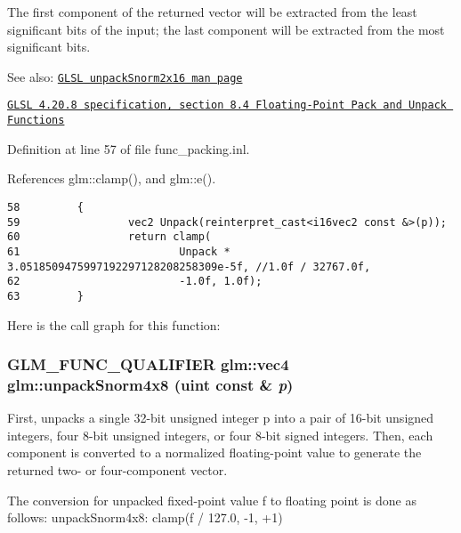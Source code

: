 The first component of the returned vector will be extracted from the least significant bits of the input; the last component will be extracted from the most significant bits.

\begin{Desc}
\item[See also:]\href{http://www.opengl.org/sdk/docs/manglsl/xhtml/unpackSnorm2x16.xml}{\tt GLSL unpackSnorm2x16 man page} 

\href{http://www.opengl.org/registry/doc/GLSLangSpec.4.20.8.pdf}{\tt GLSL 4.20.8 specification, section 8.4 Floating-Point Pack and Unpack Functions} \end{Desc}


Definition at line 57 of file func\_\-packing.inl.

References glm::clamp(), and glm::e().

\begin{Code}\begin{verbatim}58         {
59                 vec2 Unpack(reinterpret_cast<i16vec2 const &>(p));
60                 return clamp(
61                         Unpack * 3.0518509475997192297128208258309e-5f, //1.0f / 32767.0f,
62                         -1.0f, 1.0f);
63         }
\end{verbatim}
\end{Code}




Here is the call graph for this function:\hypertarget{group__core__func__packing_g126a0deffef1f2d10dd67237981a870b}{
\subsubsection[unpackSnorm4x8]{\setlength{\rightskip}{0pt plus 5cm}GLM\_\-FUNC\_\-QUALIFIER {\bf glm::vec4} glm::unpackSnorm4x8 (uint const \& {\em p})}}
\label{group__core__func__packing_g126a0deffef1f2d10dd67237981a870b}


First, unpacks a single 32-bit unsigned integer p into a pair of 16-bit unsigned integers, four 8-bit unsigned integers, or four 8-bit signed integers. Then, each component is converted to a normalized floating-point value to generate the returned two- or four-component vector.

The conversion for unpacked fixed-point value f to floating point is done as follows: unpackSnorm4x8: clamp(f / 127.0, -1, +1)

